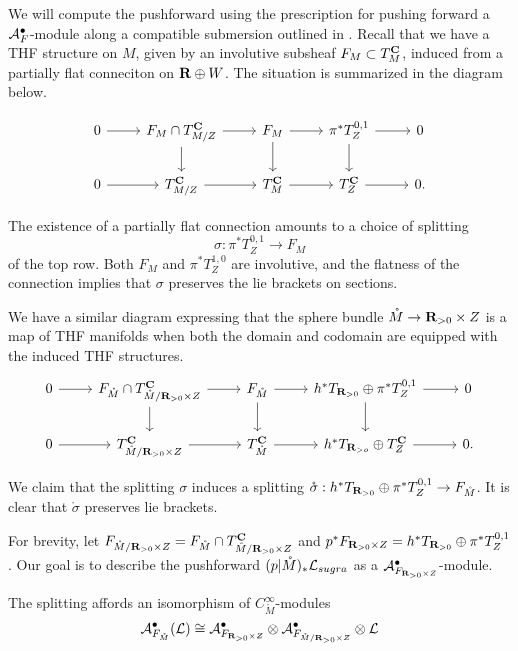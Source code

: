 We will compute the pushforward using the prescription for pushing forward a $\mathcal A^{\bullet}_{F}$-module along a compatible submersion outlined in \cite{KormanThesis}. Recall that we have a THF structure on $M$, given by an involutive subsheaf $F_{M}\subset T^{\mathbf{C}}_{M}$, induced from a partially flat conneciton on $\mathbf{R}\oplus W$. The situation is summarized in the diagram below.

\[
  \begin{tikzcd}
    0 \ar[r] & F_{M}\cap T_{M/Z}^{\C}\ar[r]\ar[d] & F_{M}\ar[r]\ar[d]  & \pi^{*}T^{0,1}_{Z}\ar[r]\ar[d] & 0 \\
    0 \ar[r] & T_{M/Z}^{\C}\ar[r] & T_{M}^{\C}\ar[r] & T_{Z}^{\C}\ar[r] & 0.
  \end{tikzcd}
\]

The existence of a partially flat connection amounts to a choice of splitting \[\sigma: \pi^{*}T^{0,1}_{Z}\to F_{M}\] of the top row. Both $F_{M}$ and $\pi^{*}T^{1,0}_{Z}$ are involutive, and the flatness of the connection implies that $\sigma$ preserves the lie brackets on sections.

We have a similar diagram expressing that the sphere bundle $\mathring M \to \mathbf{R}_{>0}\times Z$ is a map of THF manifolds when both the domain and codomain are equipped with the induced THF structures.
\[
  \begin{tikzcd}
    0 \ar[r] & F_{\mathring M}\cap T_{\mathring M/\R_{>0}\times Z}^{\C}\ar[r]\ar[d] & F_{\mathring M}\ar[r]\ar[d]  & h^{*}T_{\R_{>0}}\oplus\pi^{*}T^{0,1}_{Z}\ar[r]\ar[d] & 0 \\
    0 \ar[r] & T_{\mathring M/\R_{>0}\times Z}^{\C}\ar[r] & T_{\mathring M}^{\C}\ar[r] & h^{*}T_{\R_{>o}}\oplus T_{Z}^{\C}\ar[r] & 0.
  \end{tikzcd}
\]


We claim that the splitting $\sigma$ induces a splitting $\mathring \sigma : h^{*}T_{\mathbf{R}_{>0}}\oplus \pi^{*}T^{0,1}_{Z}\to F_{\mathring M}$.  It is clear that $\mathring \sigma$ preserves lie brackets.

For brevity, let $F_{\mathring M/\mathbf{R}_{>0}\times Z} = F_{\mathring M}\cap T^{\mathbf{C}}_{\mathring M/ \mathbf{R}_{>0}\times Z}$ and $p^{*}F_{\mathbf{R}_{>0}\times Z} = h^{*}T_{\mathbf{R}_{>0}}\oplus\pi^{*}T^{0,1}_{Z}$. Our goal is to describe the pushforward $(p|\mathring M)_{*}\mathcal L_{sugra}$ as a $\mathcal A^{\bullet}_{F_{\mathbf{R}_{>0}\times Z}}$-module.

The splitting affords an isomorphism of $C^{\infty}_{\mathring M}$-modules
\[
  \mathcal A^{\bullet}_{F_{\mathring M}}(\mathcal L)\cong \mathcal A^{\bullet}_{F_{\mathbf{R}_{>0}\times Z}}\otimes \mathcal A^{\bullet}_{F_{{\mathring M/ \mathbf{R}_{>0}\times Z}}}\otimes \mathcal L
\]

